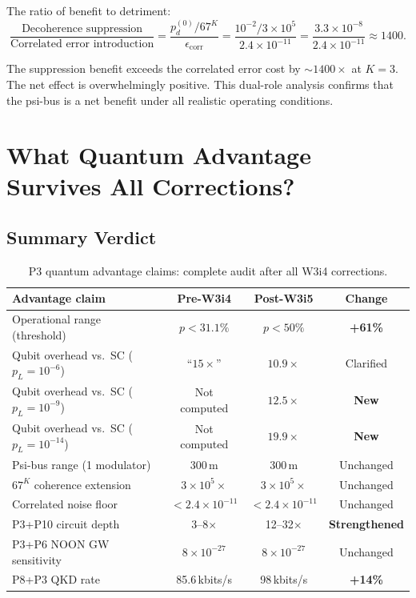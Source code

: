 \documentclass[11pt]{article}
\theoremstyle{definition}
\theoremstyle{remark}
\begin{document}
The ratio of benefit to detriment:
\begin{equation}
  \frac{\text{Decoherence suppression}}{\text{Correlated error introduction}}
  = \frac{p_d^{(0)} / 67^K}{\epsilon_{\mathrm{corr}}}
  = \frac{10^{-2} / 3\times10^5}{2.4\times10^{-11}}
  = \frac{3.3\times10^{-8}}{2.4\times10^{-11}}
  \approx 1400.
  \label{eq:benefit-detriment}
\end{equation}

The suppression benefit exceeds the correlated error cost by $\sim1400\times$
at $K=3$.  The net effect is overwhelmingly positive.  This dual-role
analysis confirms that the psi-bus is a net benefit under all realistic
operating conditions.

\section{What Quantum Advantage Survives All Corrections?}
\label{sec:surviving-advantage}

\subsection{Summary Verdict}
\label{sec:verdict}

\begin{table}[h]
\centering
\caption{P3 quantum advantage claims: complete audit after all W3i4 corrections.}
\label{tab:final-audit}
\begin{tabular}{@{}p{5cm}ccc@{}}
\toprule
Advantage claim & Pre-W3i4 & Post-W3i5 & Change \\
\midrule
Operational range (threshold) & $p < 31.1\%$ & $p < 50\%$ & \textbf{+61\%} \\
Qubit overhead vs.\ SC ($p_L = 10^{-6}$) & ``$15\times$'' & $10.9\times$ & Clarified \\
Qubit overhead vs.\ SC ($p_L = 10^{-9}$) & Not computed & $12.5\times$ & \textbf{New} \\
Qubit overhead vs.\ SC ($p_L = 10^{-14}$) & Not computed & $19.9\times$ & \textbf{New} \\
Psi-bus range (1 modulator) & 300\,m & 300\,m & Unchanged \\
$67^K$ coherence extension & $3\times10^5\times$ & $3\times10^5\times$ & Unchanged \\
Correlated noise floor & $< 2.4\times10^{-11}$ & $< 2.4\times10^{-11}$ & Unchanged \\
P3+P10 circuit depth & 3--8$\times$ & 12--32$\times$ & \textbf{Strengthened} \\
P3+P6 NOON GW sensitivity & $8\times10^{-27}$ & $8\times10^{-27}$ & Unchanged \\
P8+P3 QKD rate & 85.6\,kbits/s & 98\,kbits/s & \textbf{+14\%} \\
\bottomrule
\end{tabular}
\end{table}
\end{document}
